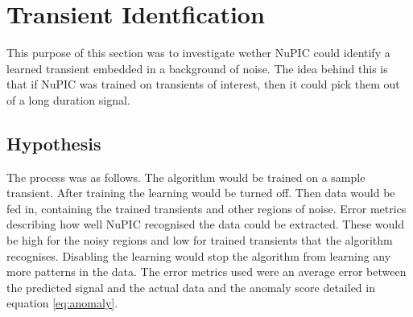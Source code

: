 \documentclass[a4paper]{jpconf}
\begin{document}
\section{Transient Identfication}
	This purpose of this section was to investigate wether NuPIC could identify a learned transient embedded in a background of noise. The idea behind this is that if NuPIC was trained on transients of interest, then it could pick them out of a long duration signal.
	\subsection{Hypothesis}
		The process was as follows. The algorithm would be trained on a sample transient. After training the learning would be turned off. Then data would be fed in, containing the trained transients and other regions of noise. Error metrics describing how well NuPIC recognised the data could be extracted. These would be high for the noisy regions and low for trained transients that the algorithm recognises. Disabling the learning would stop the algorithm from learning any more patterns in the data. The error metrics used were an average error between the predicted signal and the actual data and the anomaly score detailed in equation \ref{eq:anomaly}.
		
\end{document}
